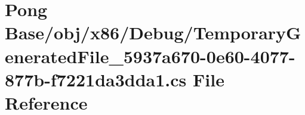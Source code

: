 \hypertarget{_debug_2_temporary_generated_file__5937a670-0e60-4077-877b-f7221da3dda1_8cs}{\section{Pong Base/obj/x86/\-Debug/\-Temporary\-Generated\-File\-\_\-5937a670-\/0e60-\/4077-\/877b-\/f7221da3dda1.cs File Reference}
\label{_debug_2_temporary_generated_file__5937a670-0e60-4077-877b-f7221da3dda1_8cs}
}
